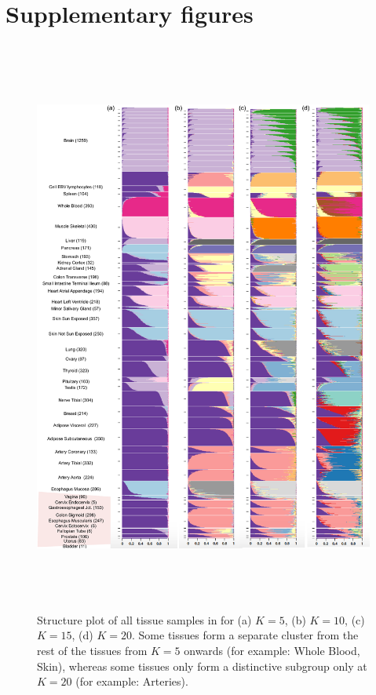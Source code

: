  \section{Supplementary figures}
 
 \begin{figure}[ht]
 \centering
\includegraphics[height=7.5in, width=6.5in]{../plots/gtex-figures/gtex-multiple-ks-04-30-2016}
    \caption{Structure plot of all tissue samples in for (a) $K=5$, (b) $K=10$, (c) $K=15$, (d) $K=20$. Some tissues form a separate cluster from the rest of the tissues from $K=5$ onwards (for example: Whole Blood, Skin), whereas some tissues only form a distinctive subgroup only at $K=20$ (for example: Arteries).}
 \label{fig:figS0}
    \end{figure}
    
